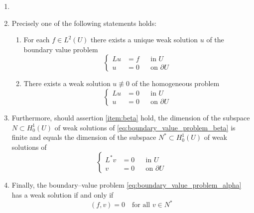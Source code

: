\begin{theorem} \label{teo:weak_solution}	
	\begin{enumerate}[label={(\arabic*)}, topsep=0pt]
		\item[]
		\item Precisely one of the following statements holds:
		\begin{enumerate}[label={(1.\arabic*)}, topsep=0pt]
			\item For each $f \in L^2(U)$ there exists a unique weak solution $u$ of
			the boundary value problem \label{item:alpha}
			\begin{equation} \label{eq:boundary_value_problem_alpha}
				\left\{
					\begin{aligned}
						L u &= f & &\text{in } U \\
						u &= 0 & &\text{on } \partial U
					\end{aligned}
				\right.
			\end{equation}
			\item There exists a weak solution $u \not\equiv 0$ of the homogeneous
			problem \label{item:beta}
			\begin{equation} \label{eq:boundary_value_problem_beta}
				\left\{
					\begin{aligned}
						L u &= 0 & &\text{in } U \\
						u &= 0 & &\text{on } \partial U
					\end{aligned}
				\right.
			\end{equation}
		\end{enumerate}
		\item Furthermore, should assertion \ref{item:beta} hold, the dimension
		of the subspace $N \subset H_0^1(U)$ of weak solutions of
		\eqref{eq:boundary_value_problem_beta} is finite and equals the
		dimension of the subspace $N^\ast \subset H_0^1(U)$ of weak solutions of
		\begin{equation*}			
			\left\{
				\begin{aligned}
					L^\ast v &= 0 & &\text{in } U \\
					v &= 0 & &\text{on } \partial U
				\end{aligned}
			\right.
		\end{equation*}
		\item Finally, the boundary--value problem
		\eqref{eq:boundary_value_problem_alpha} has a weak solution if and only if 
		\begin{equation*}
			(f, v) = 0 \quad \text{for all } v \in N^\ast
		\end{equation*}
	\end{enumerate}
\end{theorem}


